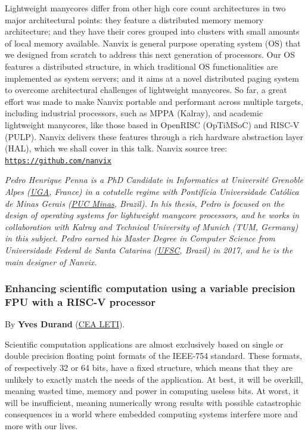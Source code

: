 \documentclass[a4paper, 10pt]{article}
\begin{document}
{Lightweight manycores differ from other high core count architectures in
two major architectural points: they feature a distributed memory memory
architecture; and they have their cores grouped into clusters with small
amounts of local memory available. Nanvix is general purpose operating
system (OS) that we designed from scratch to address this next
generation of processors. Our OS features a distributed structure, in
which traditional OS functionalities are implemented as system servers;
and it aims at a novel distributed paging system to overcome
architectural challenges of lightweight manycores. So far, a great
effort was made to make Nanvix portable and performant across multiple
targets, including industrial processors, such as MPPA (Kalray), and
academic lightweight manycores, like those based in OpenRISC (OpTiMSoC)
and RISC-V (PULP). Nanvix delivers these features through a rich
hardware abstraction layer (HAL), which we shall cover in this talk.
Nanvix source tree:
\href{https://github.com/nanvix}{\texttt{https://github.com/nanvix}}

\emph{\footnotesize Pedro Henrique Penna is a PhD Candidate in Informatics at Université Grenoble Alpes (\href{https://www.univ-grenoble-alpes.fr}{UGA}, France) in a cotutelle regime with Pontifícia Universidade Católica de Minas Gerais (\href{https://www.pucminas.br}{PUC Minas}, Brazil). In his thesis, Pedro is focused on the design of operating systems for lightweight manycore processors, and he works in collaboration with Kalray and Technical University of Munich (TUM, Germany) in this subject. Pedro earned his Master Degree in Computer Science from Universidade Federal de Santa Catarina (\href{http://ufsc.br}{UFSC}, Brazil) in 2017, and he is the main designer of Nanvix.}

\subsubsection{Enhancing scientific computation using a variable precision FPU with a  RISC-V processor}
\label{sec:orgb60eba6}
By \textbf{Yves Durand} (\href{http://www.leti-cea.fr}{CEA LETI}).

Scientific computation applications are almost exclusively based on
single or double precision floating point formats of the IEEE-754
standard. These formats, of respectively 32 or 64 bits, have a fixed
structure, which means that they are unlikely to exactly match the
needs of the application. At best, it will be overkill, meaning wasted
time, memory and power in computing useless bits. At worst, it will be
insufficient, meaning numerically wrong results with possible
catastrophic consequences in a world where embedded computing systems
interfere more and more with our lives.

}
\end{document}
